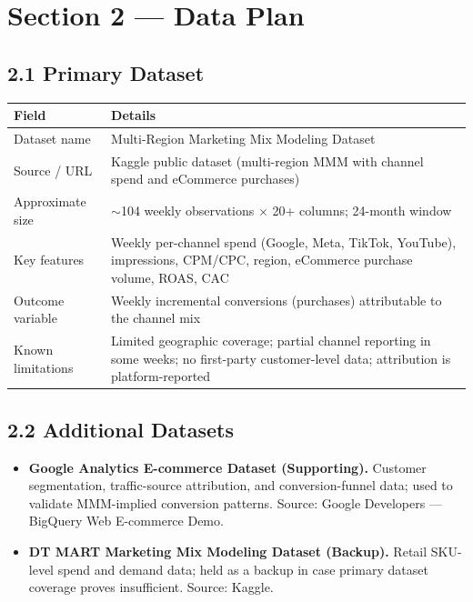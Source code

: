 \documentclass[11pt]{article}
\begin{document}
\section{Section 2 --- Data Plan}

\subsection*{2.1 \; Primary Dataset}

\begin{tabular}{@{}p{3.5cm}p{12cm}@{}}
\toprule
\textbf{Field} & \textbf{Details} \\
\midrule
Dataset name      & Multi-Region Marketing Mix Modeling Dataset \\
Source / URL      & Kaggle public dataset (multi-region MMM with channel spend and eCommerce purchases) \\
Approximate size  & $\sim$104 weekly observations $\times$ 20+ columns; 24-month window \\
Key features      & Weekly per-channel spend (Google, Meta, TikTok, YouTube), impressions, CPM/CPC, region, eCommerce purchase volume, ROAS, CAC \\
Outcome variable  & Weekly incremental conversions (purchases) attributable to the channel mix \\
Known limitations & Limited geographic coverage; partial channel reporting in some weeks; no first-party customer-level data; attribution is platform-reported \\
\bottomrule
\end{tabular}

\subsection*{2.2 \; Additional Datasets}

\begin{itemize}[leftmargin=2em, itemsep=2pt]
  \item \textbf{Google Analytics E-commerce Dataset (Supporting).} Customer segmentation, traffic-source attribution, and conversion-funnel data; used to validate MMM-implied conversion patterns. Source: Google Developers --- BigQuery Web E-commerce Demo.
  \item \textbf{DT MART Marketing Mix Modeling Dataset (Backup).} Retail SKU-level spend and demand data; held as a backup in case primary dataset coverage proves insufficient. Source: Kaggle.
\end{itemize}
\end{document}

